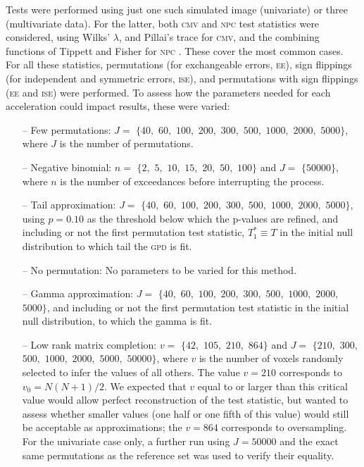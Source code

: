Tests were performed using just one such simulated image (univariate) or three (multivariate data). For the latter, both \textsc{cmv} and \textsc{npc} test statistics were considered, using Wilks' $\lambda$, and Pillai's trace for \textsc{cmv}, and the combining functions of Tippett and Fisher for \textsc{npc} \citep{Winkler2016_npc}. These cover the most common cases. For all these statistics, permutations (for exchangeable errors, \textsc{ee}), sign flippings (for independent and symmetric errors, \textsc{ise}), and permutations with sign flippings (\textsc{ee} and \textsc{ise}) were performed. To assess how the parameters needed for each acceleration could impact results, these were varied:

\begin{itemize}%
\item[--] Few permutations: $J =$ $\{40,$ $60,$ $100,$ $200,$ $300,$ $500,$ $1000,$ $2000,$ $5000\}$, where $J$ is the number of permutations.
\item[--] Negative binomial: $n =$ $\{2,$ $5,$ $10,$ $15,$ $20,$ $50,$ $100\}$ and $J =$ $\{50000\}$, where $n$ is the number of exceedances before interrupting the process.
\item[--] Tail approximation: $J =$ $\{40,$ $60,$ $100,$ $200,$ $300,$ $500,$ $1000,$ $2000,$ $5000\}$, using $p=0.10$ as the threshold below which the p-values are refined, and including or not the first permutation test statistic, $T^*_1 \equiv T$ in the initial null distribution to which tail the \textsc{gpd} is fit.
\item[--] No permutation: No parameters to be varied for this method.
\item[--] Gamma approximation: $J =$ $\{40,$ $60,$ $100,$ $200,$ $300,$ $500,$ $1000,$ $2000,$ $5000\}$, and including or not the first permutation test statistic in the initial null distribution, to which the gamma is fit.
\item[--] Low rank matrix completion: $v =$ $\{42,$ $105,$ $210,$ $864\}$ and $J =$ $\{210,$ $300,$ $500,$ $1000,$ $2000,$ $5000,$ $50000\}$, where $v$ is the number of voxels randomly selected to infer the values of all others. The value $v=210$ corresponds to $v_0=N(N+1)/2$. We expected that $v$ equal to or larger than this critical value would allow perfect reconstruction of the test statistic, but wanted to assess whether smaller values (one half or one fifth of this value) would still be acceptable as approximations; the $v=864$ corresponds to oversampling. For the univariate case only, a further run using $J=50000$ and the exact same permutations as the reference set was used to verify their equality.
\end{itemize}

